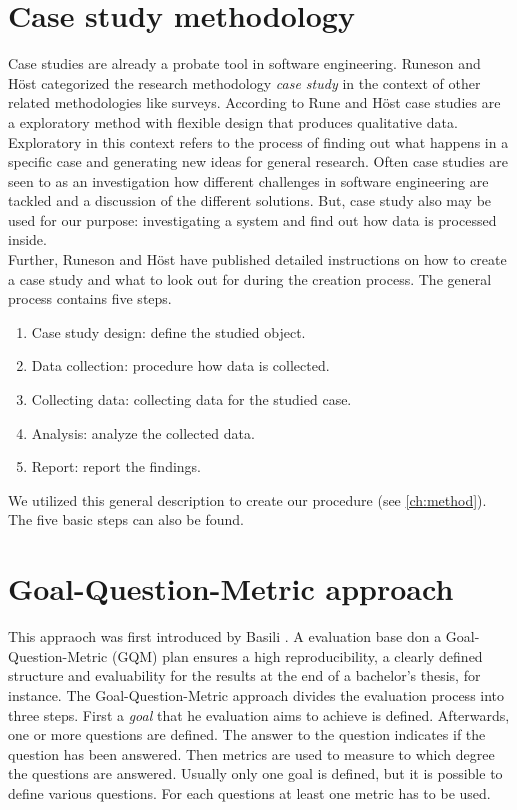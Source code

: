 \section{Case study methodology}
Case studies are already a probate tool in software engineering.  Runeson and Höst \cite{CaseStudySoftware} categorized the research methodology \textit{case study} in the context of other related methodologies like surveys. According to Rune and Höst case studies are a exploratory method with flexible design that produces qualitative data. Exploratory in this context refers to the process of finding out what happens in a specific case and generating new ideas for general research. Often case studies are seen to as an investigation how different challenges in software engineering are tackled and a discussion of the different solutions. But, case study also may be used for our purpose: investigating a system and find out how data is processed inside. \\
Further, Runeson and Höst have published detailed instructions on how to create a case study and what to look out for during the creation process. The general process contains five steps.
\begin{enumerate}
\item Case study design: define the studied object.
\item Data collection: procedure how data is collected.
\item Collecting data: collecting data for the studied case.
\item Analysis: analyze the collected data.
\item Report: report the findings.
\end{enumerate}
We utilized this general description to create our procedure (see \autoref{ch:method}). The five basic steps can also be found.
\section{Goal-Question-Metric approach}
\label{GQM_Expl}
This appraoch was first introduced by Basili \cite{GQM_Intro}. A evaluation base don a Goal-Question-Metric (GQM) plan ensures a high reproducibility, a clearly defined structure and evaluability for the results at the end of a bachelor's thesis, for instance.
The Goal-Question-Metric approach divides the evaluation process into three steps. First a \textit{goal} that he evaluation aims to achieve is defined. Afterwards, one or more questions are defined. The answer to the question indicates if the question has been answered. Then metrics are used to measure to which degree the questions are answered. Usually only one goal is defined, but it is possible to define various questions. For each questions at least one metric has to be used. 
